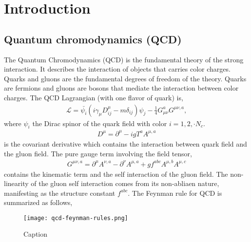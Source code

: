 \chapter{Introduction}
\section{Quantum chromodynamics (QCD)}
The Quantum Chromodynamics (QCD) is the fundamental theory of the strong interaction.
It describes the interaction of objects that carries color charges. 
Quarks and gluons are the fundamental degrees of freedom of the theory. 
Quarks are fermions and gluons are bosons that mediate the interaction between color charges.
The QCD Lagrangian (with one flavor of quark) is,
\begin{eqnarray}
\mathcal{L} = \bar{\psi_i} \left(i\gamma_\mu D^\mu_{ij} -m \delta_{ij} \right)\psi_j - \frac{1}{4}G_{\mu\nu}^a G^{\mu\nu,a},
\end{eqnarray}
where $\psi_i$ the Dirac spinor of the quark field with color $i = 1,2,\cdot N_c$. 
\begin{eqnarray}
D^\mu = \partial^\mu - i g T^a A^{\mu, a}
\end{eqnarray}
is the covariant derivative which contains the interaction between quark field and the gluon field.
The pure gauge term involving the field tensor,
\begin{eqnarray}
G^{\mu\nu,a} = \partial^\mu A^{\nu, a} - \partial^\nu A^{\mu, a} + g f^{abc} A^{\mu,b}A^{\mu,c}
\end{eqnarray}
contains the kinematic term and the self interaction of the gluon field.
The non-linearity of the gluon self interaction comes from its non-abliaen nature, manifesting as the structure constant $f^{abc}$.
The Feynman rule for QCD is summarized as follows,
\begin{figure}
    \centering
    \texttt{[image: qcd-feynman-rules.png]}
    \caption{Caption}
    \label{fig:qcd-feynman}
\end{figure}

